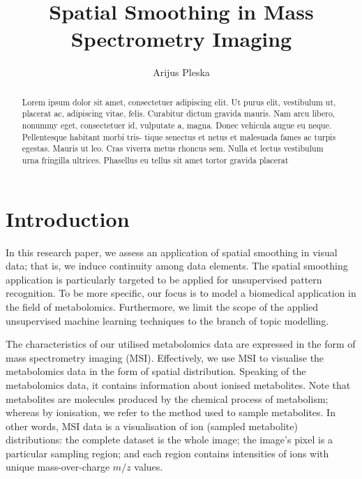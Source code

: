 \documentclass{mpaper}
\begin{document}
\title{Spatial Smoothing in Mass Spectrometry Imaging}
\author{Arijus Pleska}

\maketitle

\begin{abstract}
Lorem ipsum dolor sit amet, consectetuer adipiscing elit. Ut purus elit, vestibulum ut, placerat ac, adipiscing vitae, felis. Curabitur dictum gravida mauris. Nam arcu libero, nonummy eget, consectetuer id, vulputate a, magna. Donec vehicula augue eu neque. Pellentesque habitant morbi tris- tique senectus et netus et malesuada fames ac turpis egestas. Mauris ut leo. Cras viverra metus rhoncus sem. Nulla et lectus vestibulum urna fringilla ultrices. Phasellus eu tellus sit amet tortor gravida placerat
\end{abstract}

\section{Introduction}

\par In this research paper, we assess an application of spatial smoothing in visual data; that is, we induce continuity among data elements. The spatial smoothing application is particularly targeted to be applied for unsupervised pattern recognition. To be more specific, our focus is to model a biomedical application in the field of metabolomics. Furthermore, we limit the scope of the applied unsupervised machine learning techniques to the branch of topic modelling.  

\par The characteristics of our utilised metabolomics data are expressed in the form of mass spectrometry imaging (MSI). Effectively, we use MSI to visualise the metabolomics data in the form of spatial distribution. Speaking of the metabolomics data, it contains information about ionised metabolites. Note that metabolites are molecules produced by the chemical process of metabolism; whereas by ionisation, we refer to the method used to sample metabolites. In other words, MSI data is a visualisation of ion (sampled metabolite) distributions: the complete dataset is the whole image; the image's pixel is a particular sampling region; and each region contains intensities of ions with unique mass-over-charge $m/z$ values. 
\end{document}
